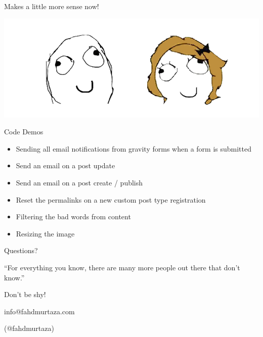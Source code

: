 \documentclass[10pt]{beamer}
\begin{document}
    \begin{frame}
        \begin{center}
            \begin{Huge}
                Makes a little more sense now!
            \end{Huge}

            \vfill{}
            \includegraphics[width=1\textwidth]{images/sense}
        \end{center}
    \end{frame}

    \begin{frame}{Code Demos}
        \begin{itemize}
            \item Sending all email notifications from gravity forms when a form is submitted
            \item Send an email on a post update
            \item Send an email on a post create / publish
            \item Reset the permalinks on a new custom post type registration 
            \item Filtering the bad words from content
            \item Resizing the image
        \end{itemize}
    \end{frame}

    \begin{frame}
        
    \end{frame}
    
    \begin{frame}[standout]
        \begin{Huge}
            Questions?
        \end{Huge}

        \vfill{}
        ``For everything you know, there are many more people out there that don't know.''
        
        \vfill{}
        \begin{large}
            Don't be shy!
        \end{large}

        \vfill{}

        \begin{center}
            info@fahdmurtaza.com 

            (@fahdmurtaza)
        \end{center}
    \end{frame}
\end{document}

